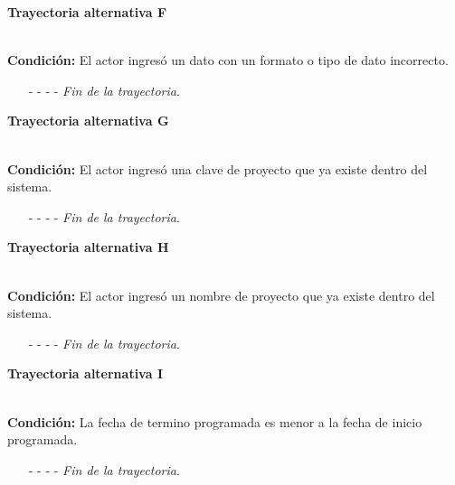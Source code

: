 	\hypertarget{CU2-2:TAF}{\textbf{Trayectoria alternativa F}}\\
	\noindent \textbf{Condición:} El actor ingresó un dato con un formato o tipo de dato incorrecto.
	\begin{enumerate}
		\UCpaso[\UCsist] Muestra el mensaje  señalando el campo que presenta el error en la pantalla .
		\UCpaso Regresa al paso \ref{CU2.2-P5} de la trayectoria principal.
		\item[- -] - - {\em {Fin de la trayectoria}}.
	\end{enumerate}
	\hypertarget{CU2-2:TAG}{\textbf{Trayectoria alternativa G}}\\
	\noindent \textbf{Condición:} El actor ingresó una clave de proyecto que ya existe dentro del sistema.
	\begin{enumerate}
		\UCpaso[\UCsist] Muestra el mensaje  señalando el campo que presenta la duplicidad en la pantalla .
		\UCpaso Regresa al paso \ref{CU2.2-P5} de la trayectoria principal.
		\item[- -] - - {\em {Fin de la trayectoria}}.
	\end{enumerate}
	\hypertarget{CU2-2:TAH}{\textbf{Trayectoria alternativa H}}\\
	\noindent \textbf{Condición:} El actor ingresó un nombre de proyecto que ya existe dentro del sistema.
	\begin{enumerate}
		\UCpaso[\UCsist] Muestra el mensaje  señalando el campo que presenta la duplicidad en la pantalla .
		\UCpaso Regresa al paso \ref{CU2.2-P5} de la trayectoria principal.
		\item[- -] - - {\em {Fin de la trayectoria}}.
	\end{enumerate}
	\hypertarget{CU2-2:TAI}{\textbf{Trayectoria alternativa I}}\\
	\noindent \textbf{Condición:} La fecha de termino programada es menor a la fecha de inicio programada.
	\begin{enumerate}
		\UCpaso[\UCsist] Muestra el mensaje  en el campo de fecha de término programada en la pantalla .
		\UCpaso Regresa al paso \ref{CU2.2-P5} de la trayectoria principal.
		\item[- -] - - {\em {Fin de la trayectoria}}.
	\end{enumerate}